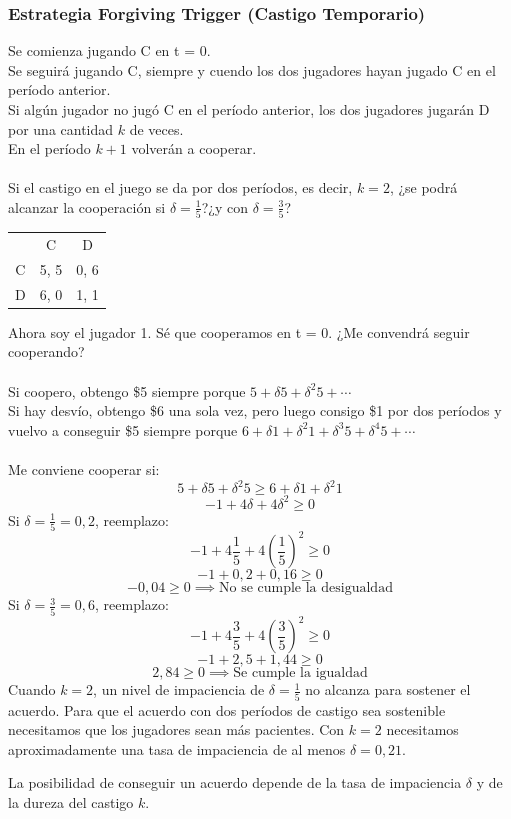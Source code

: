 \documentclass{article}
\begin{document}
        \subsubsection*{Estrategia Forgiving Trigger (Castigo Temporario)}
            Se comienza jugando C en t = 0. \\
            Se seguirá jugando C, siempre y cuendo los dos jugadores hayan jugado C en el período anterior. \\
            Si algún jugador no jugó C en el período anterior, los dos jugadores jugarán D por una cantidad $k$ de veces. \\
            En el período $k+1$ volverán a cooperar. \\
            \\
            Si el castigo en el juego se da por dos períodos, es decir, $k = 2$, ¿se podrá alcanzar la cooperación si $\delta = \frac{1}{5}$?¿y con $\delta = \frac{3}{5}$?
            \begin{table}[H]
                \centering
                    \begin{tabular}{|c|c|c|}
                          & C    & D    \\
                        C & 5, 5 & 0, 6 \\
                        D & 6, 0 & 1, 1 \\
                    \end{tabular}            
            \end{table}
            Ahora soy el jugador 1. Sé que cooperamos en t = 0. ¿Me convendrá seguir cooperando? \\
            \\
            Si coopero, obtengo \$5 siempre porque \(5 + \delta 5 + \delta^{2}5 + \cdots\) \\
            Si hay desvío, obtengo \$6 una sola vez, pero luego consigo \$1 por dos períodos y vuelvo a conseguir \$5 siempre porque \(6 + \delta 1 + \delta^{2}1 + \delta^{3}5 + \delta^{4}5 + \cdots\) \\
            \\
            Me conviene cooperar si:
            \[5+ \delta 5 + \delta^{2}5 \geq 6 + \delta 1 + \delta^{2}1\]
            \[-1 + 4 \delta + 4 \delta^{2} \geq 0\]
            Si \(\delta = \frac{1}{5} = 0,2\), reemplazo:
            \[-1+4\frac{1}{5}+4(\frac{1}{5})^{2} \geq 0\]
            \[-1+0,2+0,16 \geq 0\]
            \[-0,04 \geq 0 \implies \text{No se cumple la desigualdad}\]
            Si \(\delta = \frac{3}{5} = 0,6\), reemplazo:
            \[-1+4\frac{3}{5}+4(\frac{3}{5})^{2} \geq 0\]
            \[-1+2,5+1,44 \geq 0\]
            \[2,84 \geq 0 \implies \text{Se cumple la igualdad}\]
            Cuando $k = 2$, un nivel de impaciencia de $\delta = \frac{1}{5}$ no alcanza para sostener el acuerdo. Para que el acuerdo con dos períodos de castigo sea sostenible necesitamos que los jugadores sean más pacientes. Con $k = 2$ necesitamos aproximadamente una tasa de impaciencia de al menos $\delta = 0,21$.

            La posibilidad de conseguir un acuerdo depende de la tasa de impaciencia $\delta$ y de la dureza del castigo $k$.
\end{document}
